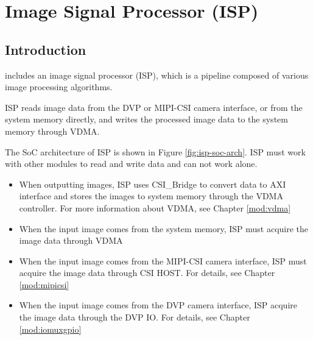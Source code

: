 \documentclass[main\_\_EN.tex]{subfiles}
\begin{document}

\ifglobal
\else
    {\let\clearpage\relax \listoftodos}
    {\let\clearpage\relax \listofdonetodos}
    \tableofcontents
\fi



\hypertarget{isp}{}
\chapter{Image Signal Processor (ISP)}
\label{mod:isp}



\section{Introduction}

\chipseries{} includes an image signal processor (ISP), which is a pipeline composed of various image processing algorithms.

ISP reads image data from the DVP or MIPI-CSI camera interface, or from the system memory directly, and writes the processed image data to the system memory through VDMA.

The SoC architecture of ISP is shown in Figure \ref{fig:isp-soc-arch}. ISP must work with other modules to read and write data and can not work alone.

\begin{itemize}
    \item When outputting images, ISP uses CSI\_Bridge to convert data to AXI interface and stores the images to system memory through the VDMA controller. For more information about VDMA, see Chapter \ref{mod:vdma} \textit{}
    \item When the input image comes from the system memory, ISP must acquire the image data through VDMA
    \item When the input image comes from the MIPI-CSI camera interface, ISP must acquire the image data through CSI HOST. For details, see Chapter \ref{mod:mipicsi} \textit{}
    \item When the input image comes from the DVP camera interface, ISP acquire the image data through the DVP IO. For details, see Chapter \ref{mod:iomuxgpio} \textit{}
\end{itemize}
\end{document}
